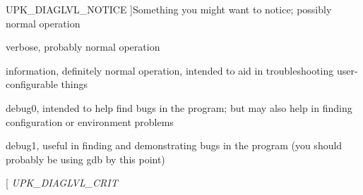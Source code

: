 \begin{Desc}
\begin{description}
{UPK\_\-DIAGLVL\_\-NOTICE\label{tp_8c_ga69a581dfd708ad2e18688e01cbcc0ff8a2d096c4906e4df530e7b2368d0169558}
}]Something you might want to notice; possibly normal operation \item[{\em 
UPK\_\-DIAGLVL\_\-VERBOSE\label{tp_8c_ga69a581dfd708ad2e18688e01cbcc0ff8af4ab159278a3a1599c370e89858ec888}
}]verbose, probably normal operation \item[{\em 
UPK\_\-DIAGLVL\_\-INFO\label{tp_8c_ga69a581dfd708ad2e18688e01cbcc0ff8a2bb69eb89e08c5587c87186e04b0aaa8}
}]information, definitely normal operation, intended to aid in troubleshooting user-\/configurable things \item[{\em 
UPK\_\-DIAGLVL\_\-DEBUG0\label{tp_8c_ga69a581dfd708ad2e18688e01cbcc0ff8af6a6be2812d975c859910213b5361e39}
}]debug0, intended to help find bugs in the program; but may also help in finding configuration or environment problems \item[{\em 
UPK\_\-DIAGLVL\_\-DEBUG1\label{tp_8c_ga69a581dfd708ad2e18688e01cbcc0ff8a77aa4e5c1c3416dea8d1e7299aaa1530}
}]debug1, useful in finding and demonstrating bugs in the program (you should probably be using gdb by this point) \item[{\em 
UPK\_\-DIAGLVL\_\-FATAL\label{tp_8c_ga69a581dfd708ad2e18688e01cbcc0ff8a600f5dbf5250560dfb55d2b960d25b95}
}]\item[{\em 
UPK\_\-DIAGLVL\_\-ALERT\label{tp_8c_ga69a581dfd708ad2e18688e01cbcc0ff8a42b4debd590867bfd13127c7998ca3eb}
}]\item[{\em 
UPK\_\-DIAGLVL\_\-CRIT\label{tp_8c_ga69a581dfd708ad2e18688e01cbcc0ff8a2459215f50532f8bd045d8926b09cbe1}
}
\end{description}
\end{Desc}
